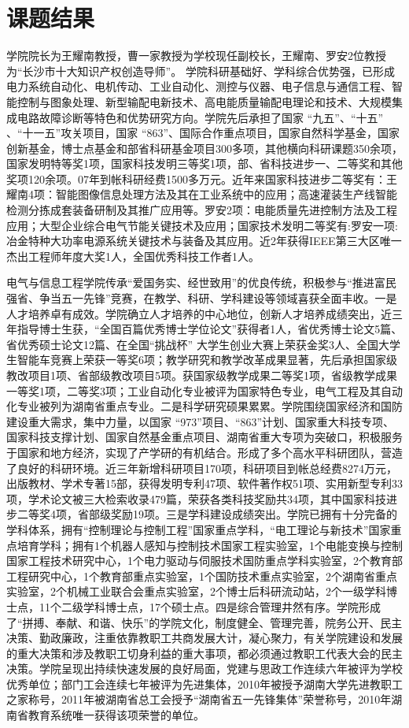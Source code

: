\section{课题结果}
学院院长为王耀南教授，曹一家教授为学校现任副校长，王耀南、罗安2位教授为“长沙市十大知识产权创造导师”。
学院科研基础好、学科综合优势强，已形成电力系统自动化、电机传动、工业自动化、测控与仪器、电子信息与通信工程、智能控制与图象处理、新型输配电新技术、高电能质量输配电理论和技术、大规模集成电路故障诊断等特色和优势研究方向。学院先后承担了国家 “九五”、“十五” 、“十一五”攻关项目，国家 “863”、国际合作重点项目，国家自然科学基金，国家创新基金，博士点基金和部省科研基金项目300多项，其他横向科研课题350余项，国家发明特等奖1项，国家科技发明三等奖1项，部、省科技进步一、二等奖和其他奖项120余项。07年到帐科研经费1500多万元。近年来国家科技进步二等奖有：王耀南4项：智能图像信息处理方法及其在工业系统中的应用；高速灌装生产线智能检测分拣成套装备研制及其推广应用等。罗安2项：电能质量先进控制方法及工程应用；大型企业综合电气节能关键技术及应用；国家技术发明二等奖有:罗安一项:冶金特种大功率电源系统关键技术与装备及其应用。近2年获得IEEE第三大区唯一杰出工程师年度大奖1人，全国优秀科技工作者1人。

电气与信息工程学院传承“爱国务实、经世致用”的优良传统，积极参与“推进富民强省、争当五一先锋”竞赛，在教学、科研、学科建设等领域喜获全面丰收。一是人才培养卓有成效。学院确立人才培养的中心地位，创新人才培养成绩突出，近三年指导博士生获，“全国百篇优秀博士学位论文”获得者1人，省优秀博士论文5篇、省优秀硕士论文12篇、在全国“挑战杯” 大学生创业大赛上荣获金奖3人、全国大学生智能车竞赛上荣获一等奖6项；教学研究和教学改革成果显著，先后承担国家级教改项目1项、省部级教改项目5项。获国家级教学成果二等奖1项，省级教学成果一等奖1项，二等奖3项；工业自动化专业被评为国家特色专业，电气工程及其自动化专业被列为湖南省重点专业。二是科学研究硕果累累。学院围绕国家经济和国防建设重大需求，集中力量，以国家 “973”项目、“863”计划、国家重大科技专项、国家科技支撑计划、国家自然基金重点项目、湖南省重大专项为突破口，积极服务于国家和地方经济，实现了产学研的有机结合。形成了多个高水平科研团队，营造了良好的科研环境。近三年新增科研项目170项，科研项目到帐总经费8274万元，出版教材、学术专著15部，获得发明专利47项、软件著作权51项、实用新型专利33项，学术论文被三大检索收录479篇，荣获各类科技奖励共34项，其中国家科技进步二等奖4项，省部级奖励19项。三是学科建设成绩突出。学院已拥有十分完备的学科体系，拥有“控制理论与控制工程”国家重点学科，“电工理论与新技术”国家重点培育学科；拥有1个机器人感知与控制技术国家工程实验室，1个电能变换与控制国家工程技术研究中心，1个电力驱动与伺服技术国防重点学科实验室，2个教育部工程研究中心，1个教育部重点实验室，1个国防技术重点实验室，2个湖南省重点实验室，2个机械工业联合会重点实验室，2个博士后科研流动站，2个一级学科博士点，11个二级学科博士点，17个硕士点。四是综合管理井然有序。学院形成了“拼搏、奉献、和谐、快乐”的学院文化，制度健全、管理完善，院务公开、民主决策、勤政廉政，注重依靠教职工共商发展大计，凝心聚力，有关学院建设和发展的重大决策和涉及教职工切身利益的重大事项，都必须通过教职工代表大会的民主决策。学院呈现出持续快速发展的良好局面，党建与思政工作连续六年被评为学校优秀单位；部门工会连续七年被评为先进集体，2010年被授予湖南大学先进教职工之家称号，2011年被湖南省总工会授予“湖南省五一先锋集体”荣誉称号，2010年湖南省教育系统唯一获得该项荣誉的单位。

\clearpage